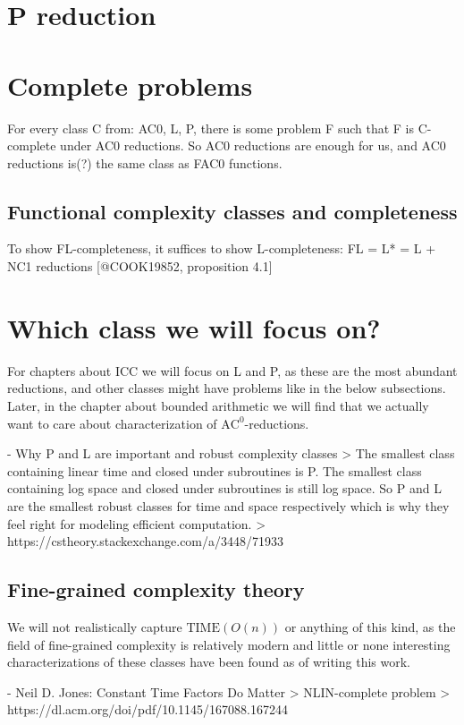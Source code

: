 \section{P reduction}

\section{Complete problems}
\label{sec:complete-problems}
For every class C from: AC0, L, P, there is some problem F such that F is C-complete under AC0 reductions.
So AC0 reductions are enough for us, and AC0 reductions is(?) the same class as FAC0 functions.

\subsection{Functional complexity classes and completeness}
To show FL-completeness, it suffices to show L-completeness: FL = L* = L + NC1 
reductions [@COOK19852, proposition 4.1]

\section{Which class we will focus on?}
\label{sec:classes-of-interest}
For chapters about ICC we will focus on L and P, as these are the most abundant reductions,
and other classes might have problems like in the below subsections.
Later, in the chapter about bounded arithmetic we will find that we actually want to care
about characterization of $\text{AC}^0$-reductions.

- Why P and L are important and robust complexity classes
> The smallest class containing linear time and closed under subroutines is P. The smallest class containing log space and closed under subroutines is still log space. So P and L are the smallest robust classes for time and space respectively which is why they feel right for modeling efficient computation.  
> https://cstheory.stackexchange.com/a/3448/71933

\subsection{Fine-grained complexity theory}
We will not realistically capture $\text{TIME}(O(n))$ or anything of this kind,
as the field of fine-grained complexity is relatively modern and little or none interesting
characterizations of these classes have been found as of writing this work.


- Neil D. Jones: Constant Time Factors Do Matter
> NLIN-complete problem  
> https://dl.acm.org/doi/pdf/10.1145/167088.167244


